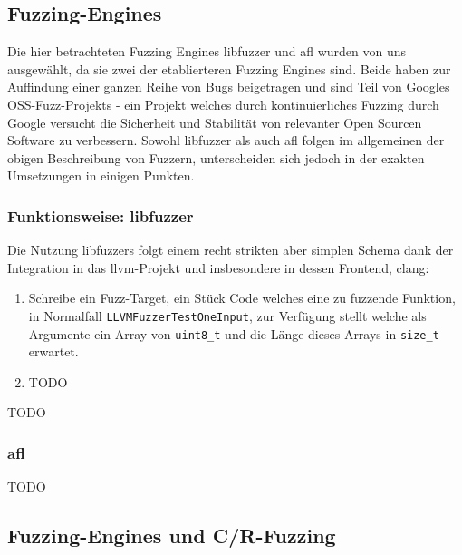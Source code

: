 \documentclass[a4paper]{article}
\begin{document}
\subsection{Fuzzing-Engines}
Die hier betrachteten Fuzzing Engines libfuzzer und afl wurden von uns ausgewählt, da sie zwei der etablierteren Fuzzing Engines sind. 
Beide haben zur Auffindung einer ganzen Reihe von Bugs beigetragen und sind Teil von Googles OSS-Fuzz-Projekts - ein Projekt welches durch kontinuierliches Fuzzing durch Google versucht die Sicherheit und Stabilität von relevanter Open Sourcen Software zu verbessern.
Sowohl libfuzzer als auch afl folgen im allgemeinen der obigen Beschreibung von Fuzzern, unterscheiden sich jedoch in der exakten Umsetzungen in einigen Punkten.
\subsubsection{Funktionsweise: libfuzzer}
Die Nutzung libfuzzers folgt einem recht strikten aber simplen Schema dank der Integration in das llvm-Projekt und insbesondere in dessen Frontend, clang:
\begin{enumerate}
    \item Schreibe ein Fuzz-Target, ein Stück Code welches eine zu fuzzende Funktion, in Normalfall \texttt{LLVMFuzzerTestOneInput}, zur Verfügung stellt welche als Argumente ein Array von \texttt{uint8\_t} und die Länge dieses Arrays in \texttt{size\_t} erwartet. 
    \item TODO
\end{enumerate}
TODO
\subsubsection{afl}
TODO


\subsection{Fuzzing-Engines und C/R-Fuzzing}
\end{document}
